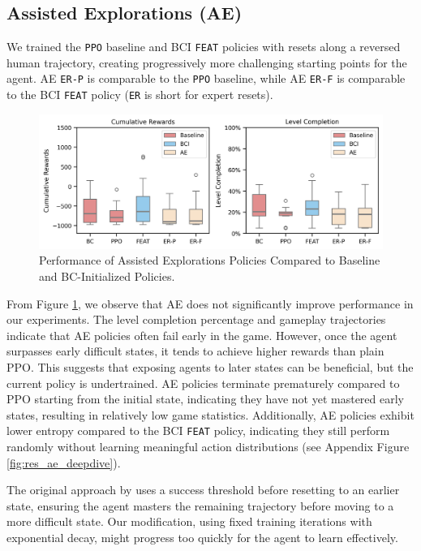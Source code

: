 \documentclass{article}
\begin{document}
\subsection{Assisted Explorations (AE)}

We trained the \texttt{PPO} baseline and BCI \texttt{FEAT} policies 
with resets along a reversed human trajectory, creating progressively 
more challenging starting points for the agent.
AE \texttt{ER-P} is comparable to the \texttt{PPO} baseline, while 
AE \texttt{ER-F} is comparable to the BCI \texttt{FEAT} policy (\texttt{ER} is short 
for expert resets).

\begin{figure}[htbp]
      \centering
      \includegraphics[width=\columnwidth]{figures/cum_rewards_ae.png}
      \caption{Performance of Assisted Explorations Policies Compared to Baseline 
      and BC-Initialized Policies.}
      \label{fig:res_ae}
\end{figure}
From Figure \ref{fig:res_ae}, we observe that AE does not significantly 
improve performance in our experiments. The level completion percentage 
and gameplay trajectories indicate that AE policies often fail early in 
the game. However, once the agent surpasses early difficult states, it 
tends to achieve higher rewards than plain PPO. This suggests that 
exposing agents to later states can be beneficial, but the current 
policy is undertrained. AE policies terminate prematurely compared to 
PPO starting from the initial state, indicating they have not yet 
mastered early states, resulting in relatively low game statistics.
Additionally, AE policies exhibit lower entropy compared to the BCI 
\texttt{FEAT} policy, indicating they still perform randomly without 
learning meaningful action distributions (see Appendix Figure 
\ref{fig:res_ae_deepdive}).

The original approach by \cite{salimans2018learningmontezumasrevengesingle} 
uses a success threshold before resetting to an earlier state, ensuring 
the agent masters the remaining trajectory before moving to a more 
difficult state. Our modification, using fixed training iterations 
with exponential decay, might progress too quickly for the agent to 
learn effectively.
\end{document}
